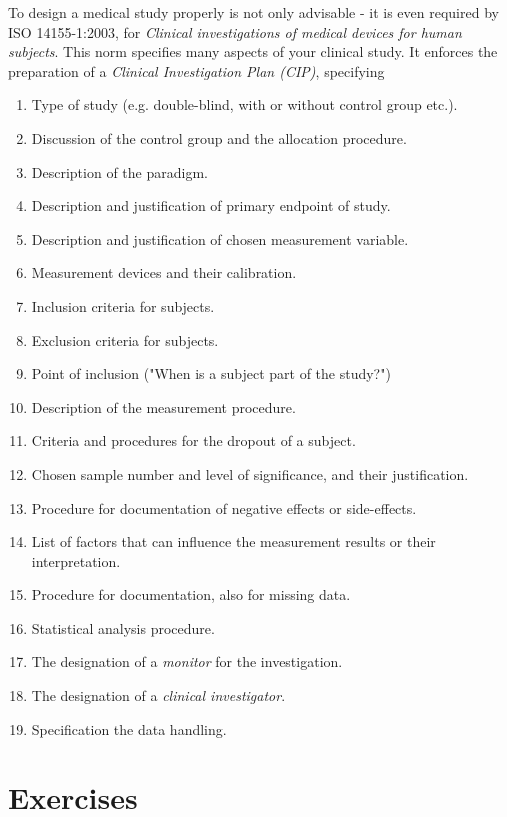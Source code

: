 To design a medical study properly is not only advisable - it is even required by ISO 14155-1:2003, for \emph{Clinical investigations of medical devices for human subjects}. This norm specifies many aspects of your clinical study. It enforces the preparation of a \emph{Clinical Investigation Plan (CIP)}, specifying

\begin{enumerate}
  \item Type of study (e.g. double-blind, with or without control group etc.).
  \item Discussion of the control group and the allocation procedure.
  \item Description of the paradigm.
  \item Description and justification of primary endpoint of study.
  \item Description and justification of chosen measurement variable.
  \item Measurement devices and their calibration.
  \item Inclusion criteria for subjects.
  \item Exclusion criteria for subjects.
  \item Point of inclusion ("When is a subject part of the study?")
  \item Description of the measurement procedure.
  \item Criteria and procedures for the dropout of a subject.
  \item Chosen sample number and level of significance, and their justification.
  \item Procedure for documentation of negative effects or side-effects.
  \item List of factors that can influence the measurement results or their interpretation.
  \item Procedure for documentation, also for missing data.
  \item Statistical analysis procedure.
  \item The designation of a \emph{monitor} for the investigation.
  \item The designation of a \emph{clinical investigator}.
  \item Specification the data handling.
\end{enumerate}

\section{Exercises}

